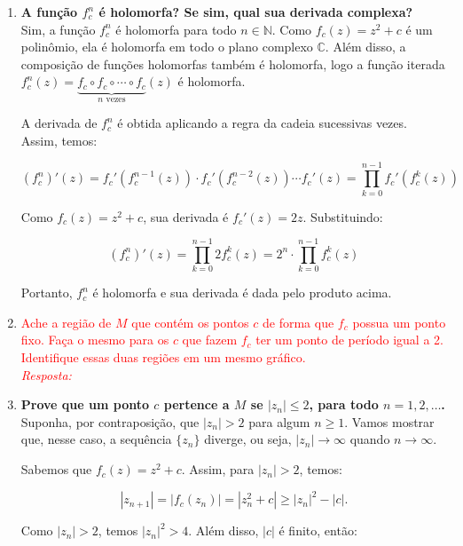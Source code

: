 \begin{enumerate}[label=(\alph*)]
    \item \textbf{A função \( f_c^n \) é holomorfa? Se sim, qual sua derivada complexa?} \\
    
         Sim, a função \( f_c^n \) é holomorfa para todo \( n \in \mathbb{N} \). Como \( f_c(z) = z^2 + c \) é um polinômio, ela é holomorfa em todo o plano complexo \( \mathbb{C} \). Além disso, a composição de funções holomorfas também é holomorfa, logo a função iterada \( f_c^n(z) = \underbrace{f_c \circ f_c \circ \cdots \circ f_c}_{n \text{ vezes}}(z) \) é holomorfa.

        A derivada de \( f_c^n \) é obtida aplicando a regra da cadeia sucessivas vezes. Assim, temos:

        \[
        (f_c^n)'(z) = f_c'(f_c^{n-1}(z)) \cdot f_c'(f_c^{n-2}(z)) \cdots f_c'(z) = \prod_{k=0}^{n-1} f_c'(f_c^k(z))
        \]

        Como \( f_c(z) = z^2 + c \), sua derivada é \( f_c'(z) = 2z \). Substituindo:

        \[
        (f_c^n)'(z) = \prod_{k=0}^{n-1} 2 f_c^k(z) = 2^n \cdot \prod_{k=0}^{n-1} f_c^k(z)
        \]

        Portanto, \( f_c^n \) é holomorfa e sua derivada é dada pelo produto acima.


    \item \textcolor{red}{Ache a região de \( M \) que contém os pontos \( c \) de forma que \( f_c \) possua um ponto fixo. Faça o mesmo para os \( c \) que fazem \( f_c \) ter um ponto de período igual a 2. Identifique essas duas regiões em um mesmo gráfico. \\
        \textit{Resposta: }}

    \item \textbf{Prove que um ponto \( c \) pertence a \( M \) se \( |z_n| \leq 2 \), para todo \( n = 1, 2, \ldots \). }\\

        Suponha, por contraposição, que \( |z_n| > 2 \) para algum \( n \geq 1 \). Vamos mostrar que, nesse caso, a sequência \( \{z_n\} \) diverge, ou seja, \( |z_n| \to \infty \) quando \( n \to \infty \).

        Sabemos que \( f_c(z) = z^2 + c \). Assim, para \( |z_n| > 2 \), temos:

        \[
        |z_{n+1}| = |f_c(z_n)| = |z_n^2 + c| \geq |z_n|^2 - |c|.
        \]

        Como \( |z_n| > 2 \), temos \( |z_n|^2 > 4 \). Além disso, \( |c| \) é finito, então:


\end{enumerate}
